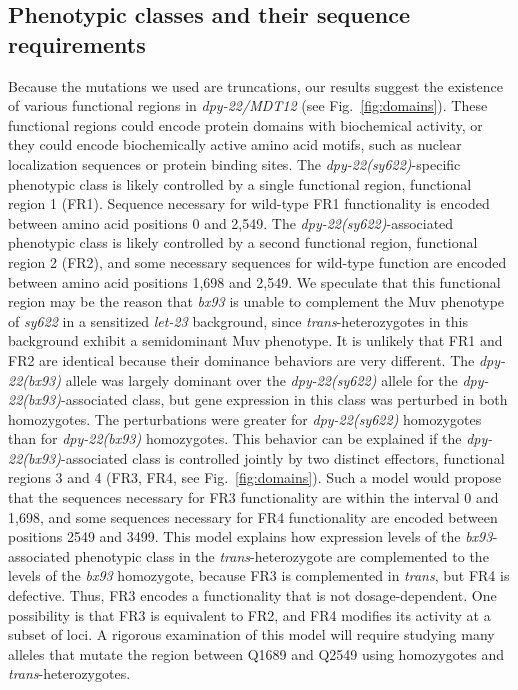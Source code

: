 \documentclass[8pt, twocolumn]{article}
\newcommand{\gene}[1]{\mbox{\emph{#1}}}
\newcommand{\dpy}[1]{\gene{dpy-22#1}}
\newcommand{\bx}{\dpy{(bx93)}}
\newcommand{\sy}{\dpy{(sy622)}}
\begin{document}
\subsection*{Phenotypic classes and their sequence requirements}
Because the mutations we used are truncations, our results suggest the existence
of various functional regions in \dpy{/MDT12} (see Fig.~\ref{fig:domains}).
These functional regions could encode protein domains with biochemical activity,
or they could encode biochemically active amino acid motifs, such as nuclear
localization sequences or protein binding sites. The \sy{}-specific phenotypic
class is likely controlled by a single functional region, functional region 1
(FR1). Sequence necessary for wild-type FR1 functionality is encoded between
amino acid positions 0 and 2,549. The \sy{}-associated phenotypic class is
likely controlled by a second functional region, functional region 2 (FR2), and
some necessary sequences for wild-type function are encoded between
amino acid positions 1,698 and 2,549. We speculate that this functional region
may be the reason that \emph{bx93} is unable to complement the Muv phenotype of
\emph{sy622} in a sensitized \emph{let-23} background, since
\emph{trans}-heterozygotes in this background exhibit a semidominant Muv
phenotype. It is unlikely that FR1 and FR2 are identical because their dominance
behaviors are very different. The \bx{} allele was largely dominant over the
\sy{} allele for the \bx{}-associated class, but gene expression in this class
was perturbed in both homozygotes. The perturbations were greater for \sy{}
homozygotes than for \bx{} homozygotes. This behavior can be explained if the
\bx{}-associated class is controlled jointly by two distinct effectors,
functional regions 3 and 4 (FR3, FR4, see Fig.~\ref{fig:domains}). Such a model
would propose that the sequences necessary for FR3 functionality are within the
interval 0 and 1,698, and some sequences necessary for FR4 functionality are
encoded between positions 2549 and 3499. This model explains how expression
levels of the \emph{bx93}-associated phenotypic class in the
\emph{trans}-heterozygote are complemented to the levels of the \emph{bx93}
homozygote, because FR3 is complemented in \emph{trans}, but FR4 is defective.
Thus, FR3 encodes a functionality that is not dosage-dependent. One possibility
is that FR3 is equivalent to FR2, and FR4 modifies its activity at a subset of
loci. A rigorous examination of this model will require studying many alleles
that mutate the region between Q1689 and Q2549 using homozygotes and
\emph{trans}-heterozygotes.
\end{document}
